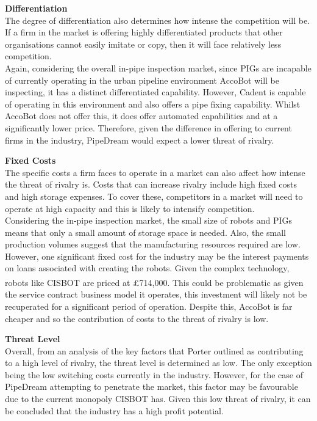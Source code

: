 \documentclass[11pt]{article}		%
\newcommand{\supercite}[1]{\textsuperscript{\cite{#1}}}		%
\begin{document}
		        \textbf{Differentiation}
		        \\
		        The degree of differentiation also determines how intense the competition will be. If a firm in the market is offering highly differentiated products that other organisations cannot easily imitate or copy, then it will face relatively less competition.
		        \\
		        \hspace*{2ex}Again, considering the overall in-pipe inspection market, since PIGs are incapable of currently operating in the urban pipeline environment AccoBot will be inspecting, it has a distinct differentiated capability. However, Cadent is capable of operating in this environment and also offers a pipe fixing capability. Whilst AccoBot does not offer this, it does offer automated capabilities and at a significantly lower price. Therefore, given the difference in offering to current firms in the industry, PipeDream would expect a lower threat of rivalry. 
		        
		        \textbf{Fixed Costs}
		        \\
		        The specific costs a firm faces to operate in a market can also affect how intense the threat of rivalry is. Costs that can increase rivalry include high fixed costs and high storage expenses. To cover these, competitors in a market will need to operate at high capacity and this is likely to intensify competition.
		        \\
		        \hspace*{2ex}Considering the in-pipe inspection market, the small size of robots and PIGs means that only a small amount of storage space is needed. Also, the small production volumes suggest that the manufacturing resources required are low. However, one significant fixed cost for the industry may be the interest payments on loans associated with creating the robots. Given the complex technology, robots like CISBOT are priced at £714,000\supercite{cisbotprice}. This could be problematic as given the service contract business model it operates, this investment will likely not be recuperated for a significant period of operation. Despite this, AccoBot is far cheaper and so the contribution of costs to the threat of rivalry is low. 
		        
		        \textbf{Threat Level}
		        \\
		        Overall, from an analysis of the key factors that Porter outlined as contributing to a high level of rivalry, the threat level is determined as low. The only exception being the low switching costs currently in the industry. However, for the case of PipeDream attempting to penetrate the market, this factor may be favourable due to the current monopoly CISBOT has. Given this low threat of rivalry, it can be concluded that the industry has a high profit potential.
		        
\end{document}
